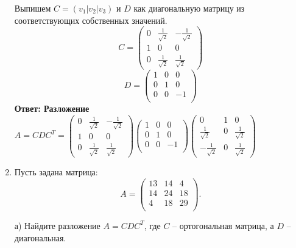 \documentclass[a4paper,12pt]{article}
\begin{document}
\begin{enumerate}
Выпишем $C=(v_1|v_2|v_3)$ и $D$ как диагональную матрицу из соответствующих собственных значений.
$$C=\begin{pmatrix}
0&\frac{1}{\sqrt{2}}&-\frac{1}{\sqrt{2}}\\
1&0&0\\
0&\frac{1}{\sqrt{2}}&\frac{1}{\sqrt{2}}
\end{pmatrix}$$
$$D=\begin{pmatrix}
{1}&{0}&{0}\\
{0}&{1}&{0}\\
{0}&{0}&{-1}\\
\end{pmatrix}$$
\textbf{Ответ: Разложение $A = C D C^T = \begin{pmatrix}
0&\frac{1}{\sqrt{2}}&-\frac{1}{\sqrt{2}}\\
1&0&0\\
0&\frac{1}{\sqrt{2}}&\frac{1}{\sqrt{2}}
\end{pmatrix}\begin{pmatrix}
{1}&{0}&{0}\\
{0}&{1}&{0}\\
{0}&{0}&{-1}\\
\end{pmatrix}
\begin{pmatrix}
0&1&0\\
\frac{1}{\sqrt{2}}&0&\frac{1}{\sqrt{2}}\\
-\frac{1}{\sqrt{2}}&0&\frac{1}{\sqrt{2}}
\end{pmatrix}$}


\item  Пусть задана матрица:
$$A = 
\begin{pmatrix}
{13}&{14}&{4}\\
{14}&{24}&{18}\\
{4}&{18}&{29}\\
\end{pmatrix}.$$

\vspace{5pt}


а) Найдите разложение $A = C D C^T$, где $C$ -- ортогональная матрица, а $D$ -- диагональная.


\end{enumerate}
\end{document}
